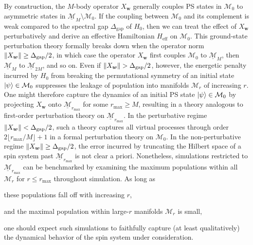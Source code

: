 \documentclass[nofootinbib,notitlepage,11pt]{revtex4-2}
\renewcommand{\t}{\text} %
\newcommand{\m}{\bm} %
\newcommand{\1}{\mathds{1}}
\newcommand{\M}{\mathcal{M}}
\newcommand{\ul}{\underline}
\newcommand{\floor}[1]{\lfloor{#1}\rfloor}
\begin{document}
By construction, the $M$-body operator $X_{\m w}$ generally couples PS
states in $\M_0$ to asymmetric states in $\ul{\M}_M\setminus\M_0$.  If
the coupling between $\M_0$ and its complement is weak compared to the
spectral gap $\Delta_{\t{gap}}$ of $H_0$, then we can treat the effect
of $X_{\m w}$ perturbatively and derive an effective Hamiltonian
$H_{\t{eff}}$ on $\M_0$.  This ground-state perturbation theory
formally breaks down when the operator norm
$\norm{X_{\m w}}\ge\Delta_{\t{gap}}/2$, in which case the operator
$X_{\m w}$ first couples $\M_0$ to $\ul{\M}_M$, then $\ul{\M}_M$ to
$\ul{\M}_{2M}$, and so on.  Even if
$\norm{X_{\m w}}>\Delta_{\t{gap}}/2$, however, the energetic penalty
incurred by $H_0$ from breaking the permutational symmetry of an
initial state $\ket\psi\in\M_0$ suppresses the leakage of population
into manifolds $\M_r$ of increasing $r$.  One might therefore capture
the dynamics of an initial PS state $\ket\psi\in\M_0$ by projecting
$X_{\m w}$ onto $\ul{\M}_{r_{\t{max}}}$ for some $r_{\t{max}}\ge M$,
resulting in a theory analogous to first-order perturbation theory on
$\ul{\M}_{r_{\t{max}}}$.  In the perturbative regime
$\norm{X_{\m w}}<\Delta_{\t{gap}}/2$, such a theory captures all
virtual processes through order $2\floor{r_{\t{max}}/M}+1$ in a formal
perturbation theory on $\M_0$.  In the non-perturbative regime
$\norm{X_{\m w}}\ge\Delta_{\t{gap}}/2$, the error incurred by
truncating the Hilbert space of a spin system past
$\ul{\M}_{r_{\t{max}}}$ is not clear a priori.  Nonetheless,
simulations restricted to $\ul{\M}_{r_{\t{max}}}$ can be benchmarked
by examining the maximum populations within all $\M_r$ for
$r\le r_{\t{max}}$ throughout simulation.  As long as
\begin{enumerate*}
\item these
populations fall off with increasing $r$,
\item and the maximal population within large-$r$ manifolds $\M_r$ is
  small,
\end{enumerate*}
one should expect such simulations to faithfully capture (at least
qualitatively) the dynamical behavior of the spin system under
consideration.
\end{document}
